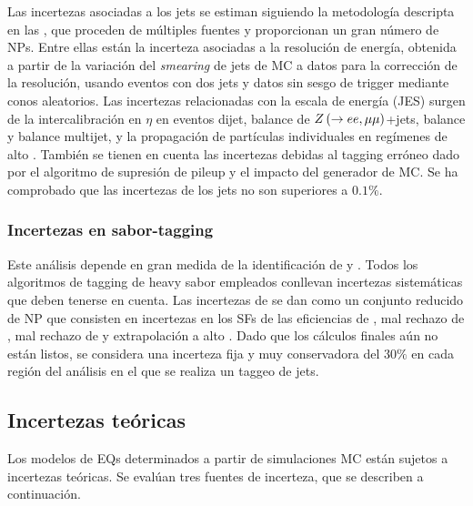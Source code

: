Las incertezas asociadas a los jets se estiman siguiendo la metodología descripta en las , que proceden de múltiples fuentes y proporcionan un gran número de \acp{NP}.
Entre ellas est\'an la incerteza asociadas a la resolución de energía, obtenida a partir de la variación del \textit{smearing} de jets de \ac{MC} a datos para la corrección de la resolución, usando eventos con dos jets y datos sin sesgo de trigger mediante conos aleatorios.
Las incertezas relacionadas con la escala de energía (JES) surgen de la intercalibración en \(\eta\) en eventos dijet, balance de \(Z\left(\rightarrow ee, \mu\mu\right)\)+jets, balance \gammajet y balance multijet, y la propagación de partículas individuales en regímenes de alto \pt.
También se tienen en cuenta las incertezas debidas al tagging erróneo dado por el algoritmo de supresión de pileup y el impacto del generador de \ac{MC}.
Se ha comprobado que las incertezas de los jets no son superiores a \(0.1\%\).









\subsubsection{Incertezas en sabor-tagging}

Este análisis depende en gran medida de la identificación de \bjets y \cjets. Todos los algoritmos de tagging de heavy sabor empleados conllevan incertezas sistemáticas que deben tenerse en cuenta. Las incertezas de \btagging se dan como un conjunto reducido de \ac{NP} que consisten en incertezas en los \acp{SF} de las eficiencias de \btagging, mal rechazo de \cjet, mal rechazo de \ljet y extrapolación a alto \pt. Dado que los cálculos finales aún no están listos, se considera una incerteza fija y muy conservadora del \(30\%\) en cada región del análisis en el que se realiza un taggeo de jets.








\subsection{Incertezas teóricas}
\label{subsec:signals:systs:theo}

Los modelos de \acp{EQ} determinados a partir de simulaciones \ac{MC} están sujetos a incertezas teóricas. Se evalúan tres fuentes de incerteza, que se describen a continuación.


